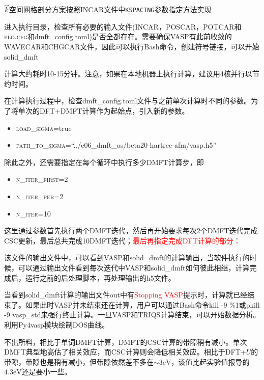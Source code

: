 $\vec k$空间网格剖分方案按照\textrm{INCAR}文件中\texttt{KSPACING}参数指定方法实现

进入执行目录，检查所有必要的输入文件(\textrm{INCAR}，\textrm{POSCAR}，\textrm{POTCAR}和\textsc{plo.cfg}和\textrm{dmft\_config.toml})是否全都存在。需要确保\textrm{VASP}有此前收敛的\textrm{WAVECAR}和\textrm{CHGCAR}文件，因此可以执行\textrm{Bash}命令，创建符号链接，可以开始\textrm{solid\_dmft}

计算大约耗时10-15分钟。注意，如果在本地机器上执行计算，建议用4核并行以节约时间。

在计算执行过程中，检查\textrm{dmft\_config.toml}文件与之前单次计算时不同的参数。为了将单次的\textrm{DFT+DMFT}计算作为起始点，引入新的参数。
\begin{itemize}
	\item \textsc{load\_sigma}=\textrm{true}
	\item \textsc{path\_to\_sigma}=``../e06\_dmft\_os/beta20-hartree-afm/vasp.h5''
\end{itemize}
除此之外，还需要指定在每个循环中执行多少\textrm{DMFT}计算步，即
\begin{itemize}
	\item \textsc{n\_iter\dmft\_first}=2
	\item \textsc{n\_iter\dmft\_per}=2
	\item \textsc{n\_iter\dmft}=10
\end{itemize}
这里通过参数首先执行两个\textrm{DMFT}迭代，然后再开始要求每次2个\textrm{DMFT}迭代完成\textrm{CSC}更新，最后总共完成10\textrm{DMFT}迭代；\textcolor{red}{最后再指定完成\textrm{DFT}计算的部分}：

该文件的输出文件中，可以看到\textrm{VASP}和\textrm{solid\_dmft}的计算输出，当软件执行的时候，可以通过输出文件看到每次迭代中\textrm{VASP}和\textrm{solid\_dmft}如何彼此相继，计算完成后，运行之前的后处理脚本，再处理输出的\textrm{h5}文件。

当看到\textrm{solid\_dmft}计算的输出文件\textrm{out}中有\textcolor{red}{Stopping VASP}提示时，计算就已经结束了。如果此时\textrm{VASP}并未结束还在计算，用户可以通过\textrm{Bash}命令\textrm{kill -9 \%1}或\textrm{pkill -9 vasp\_std}来强行终止计算。一旦\textrm{VASP}和\textrm{TRIQS}计算结束，可以开始数据分析。利用\textrm{Py4vasp}模块绘制\textrm{DOS}曲线。

不出所料，相比于单词\textrm{DMFT}计算，\textrm{DMFT}的\textrm{CSC}计算的带隙稍有减小。单次\textrm{DMFT}典型地高估了相关效应，而\textrm{CSC}计算则会降低相关效应。相比于\textrm{DFT+}$U$的带隙，带隙也是稍有减小，但带隙依然差不多在$\sim3\mathrm{eV}$，该值比起实验值报导的$4.3\mathrm{eV}$还是要小一些。

